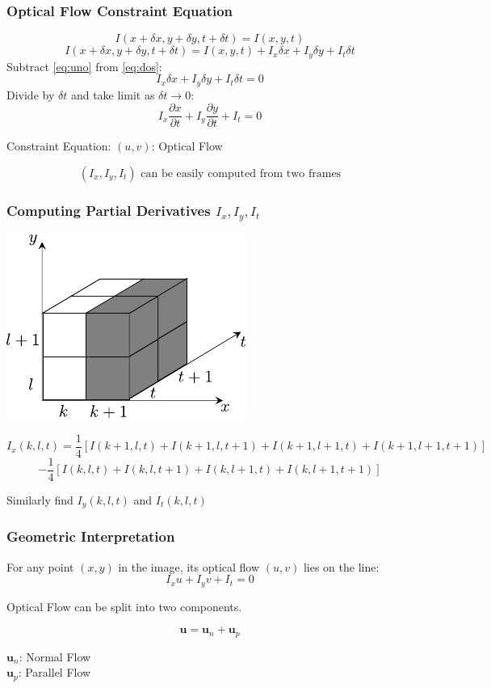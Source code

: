 \begin{frame}
  \frametitle{Optical Flow Constraint Equation}

  \begin{equation}\label{eq:uno}
    I(x + \delta x, y + \delta y, t + \delta t) = I(x, y, t)
  \end{equation}
  \begin{equation}\label{eq:dos}
    I(x + \delta x, y + \delta y, t + \delta t) = I(x, y, t) + I_x \delta x + I_y \delta y + I_t \delta t
  \end{equation}
  Subtract \eqref{eq:uno} from \eqref{eq:dos}: \quad 
  \[
  I_x \delta x + I_y \delta y + I_t \delta t = 0
  \]
  Divide by $\delta t$ and take limit as $\delta t \rightarrow 0$: \quad 
  \[
  I_x \frac{\partial x}{\partial t} + I_y \frac{\partial y}{\partial t} + I_t = 0
  \]

  Constraint Equation: \quad {} \quad $(u,v)$: Optical Flow

  \[
  (I_x, I_y, I_t) \text{ can be easily computed from two frames}
  \]

\end{frame}

\begin{frame}
  \frametitle{Computing Partial Derivatives $I_x, I_y, I_t$}


  \begin{center}
    \includegraphics[width=0.35\columnwidth]{./images/optical_flow/computing_partial_derivatives.pdf}
  \end{center}

  \[
  I_x(k, l, t) = \frac{1}{4} [I(k+1,l,t) + I(k+1,l,t+1) + I(k+1,l+1,t) + I(k+1,l+1,t+1)]
  \]
  \[
  - \frac{1}{4}[I(k,l,t) + I(k,l,t+1) + I(k,l+1,t) + I(k,l+1,t+1)]
  \]

  Similarly find $I_y(k,l,t)$ and $I_t(k,l,t)$

\end{frame}

\begin{frame}
  \frametitle{Geometric Interpretation}

  For any point $(x,y)$ in the image, its optical flow $(u,v)$ lies on the line:
  \[
  I_x u + I_y v + I_t = 0
  \]

  Optical Flow can be split into two components.

  \[
  \mathbf{u} = \mathbf{u}_n + \mathbf{u}_p
  \]

  $\mathbf{u}_n$: Normal Flow \\
  $\mathbf{u}_p$: Parallel Flow


\end{frame}

